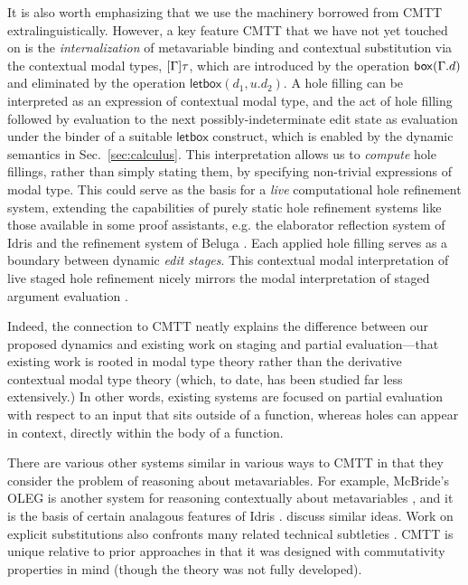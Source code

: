 It is also worth emphasizing that we use the machinery 
borrowed from CMTT extralinguistically.
%
However, a key feature CMTT that we have not yet touched on is the
\emph{internalization} of metavariable binding and contextual
substitution via the contextual modal types, $[\Gamma]\tau$, which
are introduced by the operation $\mathsf{box}(\Gamma.d)$ and
eliminated by the operation $\mathsf{letbox}(d_1, u.d_2)$.
%
A hole filling can be interpreted as an expression of contextual modal
type, and the act of hole filling followed by evaluation to the next
possibly-indeterminate edit state as evaluation under the binder of a
suitable $\mathsf{letbox}$ construct, which is enabled by the dynamic
semantics in Sec.~\ref{sec:calculus}.
%
This interpretation allows us to \emph{compute} hole fillings, rather
than simply stating them, by specifying non-trivial expressions of
modal type.
%
This could serve as the basis for a \emph{live} computational hole
refinement system, extending the capabilities of purely static hole
refinement systems like those available in some proof assistants,
e.g. the elaborator reflection system of Idris
\cite{brady2013idris,DBLP:conf/icfp/ChristiansenB16} and the refinement system of Beluga
\cite{DBLP:conf/flops/Pientka10,pientka2015inductive}.
%
Each applied hole filling serves as a boundary between dynamic
\emph{edit stages}.
%
This contextual modal interpretation of live staged hole refinement
nicely mirrors the modal interpretation of staged argument evaluation
\cite{Davies:2001op}.
%

Indeed, the connection to CMTT neatly explains
the difference between our proposed dynamics and existing work on staging and
partial evaluation---that existing work is rooted in modal type theory
\cite{Davies:2001op} rather than the derivative contextual modal type theory
(which, to date, has been studied far less extensively.) In other words,
existing systems are focused on partial evaluation with respect to an input that sits outside of a
function, whereas holes can appear in context, directly within the body of
a function. 

There are various other systems similar in various ways to CMTT in 
that they consider the problem of reasoning about metavariables. 
For example, McBride's OLEG is another system for reasoning contextually about metavariables
\cite{DBLP:phd/ethos/McBride00}, and it is the basis of certain analagous
features of Idris \cite{brady2013idris}. \citet{DBLP:conf/csl/GeuversJ02} discuss similar ideas. Work on explicit substitutions also confronts many related technical subtleties \cite{Abadi:1991fr,levy1999explicit,Abadi:1990ys}. CMTT is unique relative to prior approaches in that it was designed with commutativity properties in mind (though the theory was not fully developed).

